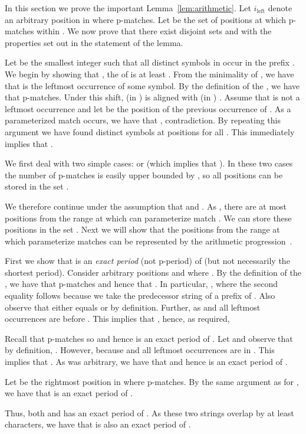 \documentclass[11pt,a4paper]{article}
\theoremstyle{theorem}
\newcommand{\ileft}{\ensuremath{i_\text{left}}\xspace}
\newcommand{\pmatches}{\mbox{p-matches}\xspace}
\newcommand{\pperiod}{\mbox{p-period}\xspace}
\begin{document}
    In this section we prove the important Lemma~\ref{lem:arithmetic}. Let \ileft denote an arbitrary position in  where  \pmatches. Let  be the set of positions at which  \pmatches within . We now prove that there exist disjoint sets  and  with the properties set out in the statement of the lemma.

     Let  be the smallest integer such that all distinct symbols in  occur in the prefix . We begin by showing that , the  of  is at least . From the minimality of , we have that  is the leftmost occurrence of some symbol. By the definition of the , we have that  \pmatches . Under this shift,  (in ) is aligned with  (in ) . Assume that  is not a leftmost occurrence and let  be the position of the previous occurrence of . As a parameterized match occurs, we have that , contradiction. By repeating this argument we have found distinct symbols at positions  for all . This immediately implies that .

     We first deal with two simple cases:  or  (which implies that ). In these two cases the number of \pmatches is easily upper bounded by , so all positions can be stored in the set .

     We therefore continue under the assumption that  and . As , there are at most  positions from the range  at which  can parameterize match . We can store these positions in the set . Next we will show that the positions from the range  at which  parameterize matches  can be represented by the arithmetic progression~.

First we show that  is an \emph{exact period} (not \pperiod) of  (but not necessarily the shortest period). Consider arbitrary positions  and  where . By the definition of the , we have that  \pmatches  and hence that .
In particular, ,
where the second equality follows because we take the predecessor string of a prefix of .
Also observe that  either equals  or  by definition. Further,  as  and all leftmost occurrences are before .
This implies that , hence, as required, 

Recall that  \pmatches  so  and hence  is an exact period of . Let 
and observe that by definition, .
However,   because  and all leftmost occurrences are in . This implies that . As  was arbitrary, we have that  and hence  is an exact period of .


Let  be the rightmost position in  where  \pmatches. By the same argument as for , we have that  is an exact period of .

Thus, both  and  has an exact period of . As these two strings overlap by at least  characters, we have that  is also an exact period of .
\end{document}
